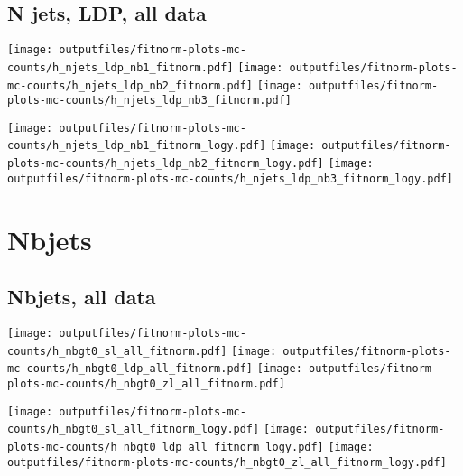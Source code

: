 \documentclass[11pt]{article}
\begin{document}
   \clearpage

    \subsection{ N jets, LDP, all data}

    \noindent
     \texttt{[image: outputfiles/fitnorm-plots-mc-counts/h\_njets\_ldp\_nb1\_fitnorm.pdf]}
     \texttt{[image: outputfiles/fitnorm-plots-mc-counts/h\_njets\_ldp\_nb2\_fitnorm.pdf]}
     \texttt{[image: outputfiles/fitnorm-plots-mc-counts/h\_njets\_ldp\_nb3\_fitnorm.pdf]}

    \noindent
     \texttt{[image: outputfiles/fitnorm-plots-mc-counts/h\_njets\_ldp\_nb1\_fitnorm\_logy.pdf]}
     \texttt{[image: outputfiles/fitnorm-plots-mc-counts/h\_njets\_ldp\_nb2\_fitnorm\_logy.pdf]}
     \texttt{[image: outputfiles/fitnorm-plots-mc-counts/h\_njets\_ldp\_nb3\_fitnorm\_logy.pdf]}

   \clearpage




    \clearpage
    \section{Nbjets}

    \subsection{ Nbjets, all data}

    \noindent
     \texttt{[image: outputfiles/fitnorm-plots-mc-counts/h\_nbgt0\_sl\_all\_fitnorm.pdf]}
     \texttt{[image: outputfiles/fitnorm-plots-mc-counts/h\_nbgt0\_ldp\_all\_fitnorm.pdf]}
     \texttt{[image: outputfiles/fitnorm-plots-mc-counts/h\_nbgt0\_zl\_all\_fitnorm.pdf]}

    \noindent
     \texttt{[image: outputfiles/fitnorm-plots-mc-counts/h\_nbgt0\_sl\_all\_fitnorm\_logy.pdf]}
     \texttt{[image: outputfiles/fitnorm-plots-mc-counts/h\_nbgt0\_ldp\_all\_fitnorm\_logy.pdf]}
     \texttt{[image: outputfiles/fitnorm-plots-mc-counts/h\_nbgt0\_zl\_all\_fitnorm\_logy.pdf]}

\end{document}
